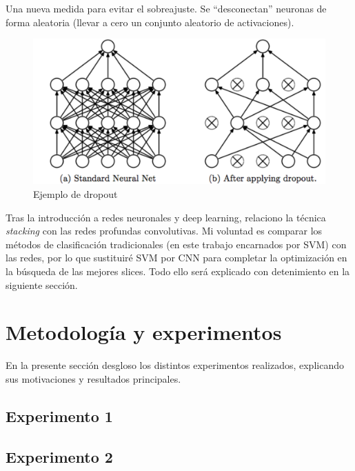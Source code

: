 \begin{itemize}
\begin{itemize}
	Una nueva medida para evitar el sobreajuste. Se ``desconectan'' neuronas de forma aleatoria (llevar a cero un conjunto aleatorio de activaciones). 
						
		\begin{figure}[H] %
		\centering
		\includegraphics[scale=0.3]{dropout.png}  %
		\caption{Ejemplo de dropout} 
		\label{fig:drop}
	\end{figure}				
\end{itemize}

 
\end{itemize}

Tras la introducción a redes neuronales y deep learning, relaciono la técnica \textit{stacking} con las redes profundas convolutivas. Mi voluntad es comparar los métodos de clasificación tradicionales (en este trabajo encarnados por SVM) con las redes, por lo que sustituiré SVM por CNN para completar la optimización en la búsqueda de las mejores slices. Todo ello será explicado con detenimiento en la siguiente sección.

\newpage 

\section{Metodología y experimentos}

En la presente sección desgloso los distintos experimentos realizados, explicando sus motivaciones y resultados principales.

\subsection{Experimento 1}

\subsection{Experimento 2}

